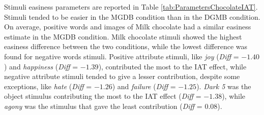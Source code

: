 \documentclass[12pt]{book}
\begin{document}
Stimuli easiness parameters are reported in Table \ref{tab:ParametersChocolateIAT}. Stimuli tended to be easier in the MGDB condition than in the DGMB condition. On average, positive words and images of Milk chocolate had a similar easiness estimate in the MGDB condition. Milk chocolate stimuli showed the highest easiness difference between the two conditions, while the lowest difference was found for negative words stimuli. Positive attribute stimuli, like \emph{joy} (\emph{Diff} = $-1.40$) and \emph{happiness} (\emph{Diff} = $-1.39$), contributed the most to the IAT effect, while negative attribute stimuli tended to give a lesser contribution, despite some exceptions, like \emph{hate} (\emph{Diff} = $-1.26$) and \emph{failure} (\emph{Diff} = $-1.25$). \emph{Dark 5} was the object stimulus contributing the most to the IAT effect (\emph{Diff} = $-1.38$), while \emph{agony} was the stimulus that gave the least contribution (\emph{Diff} = $0.08$). 
%
\end{document}
